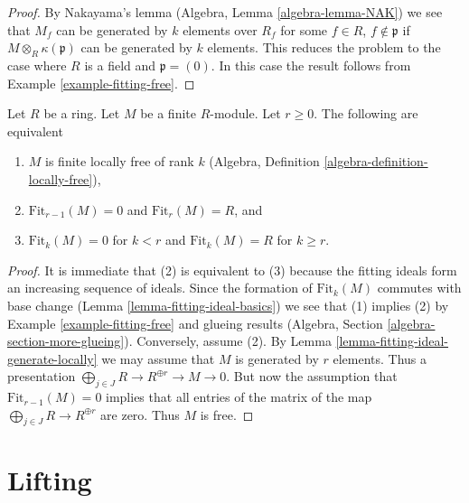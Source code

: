 \begin{proof}
By Nakayama's lemma (Algebra, Lemma \ref{algebra-lemma-NAK}) we see that
$M_f$ can be generated by $k$ elements over $R_f$ for some
$f \in R$, $f \not \in \mathfrak p$ if $M \otimes_R \kappa(\mathfrak p)$
can be generated by $k$ elements. This reduces the problem to the
case where $R$ is a field and $\mathfrak p = (0)$. In this case
the result follows from Example \ref{example-fitting-free}.
\end{proof}

\begin{lemma}
\label{lemma-fitting-ideal-finite-locally-free}
Let $R$ be a ring. Let $M$ be a finite $R$-module. Let $r \geq 0$.
The following are equivalent
\begin{enumerate}
\item $M$ is finite locally free of rank $k$
(Algebra, Definition \ref{algebra-definition-locally-free}),
\item $\text{Fit}_{r - 1}(M) = 0$ and $\text{Fit}_r(M) = R$, and
\item $\text{Fit}_k(M) = 0$ for $k < r$ and $\text{Fit}_k(M) = R$
for $k \geq r$.
\end{enumerate}
\end{lemma}

\begin{proof}
It is immediate that (2) is equivalent to (3) because the fitting ideals
form an increasing sequence of ideals.
Since the formation of $\text{Fit}_k(M)$ commutes with base change
(Lemma \ref{lemma-fitting-ideal-basics}) we see that (1) implies (2) by
Example \ref{example-fitting-free}
and glueing results (Algebra, Section \ref{algebra-section-more-glueing}).
Conversely, assume (2). By
Lemma \ref{lemma-fitting-ideal-generate-locally} we may assume that $M$
is generated by $r$ elements. Thus a presentation
$\bigoplus_{j \in J} R \to R^{\oplus r} \to M \to 0$.
But now the assumption that $\text{Fit}_{r - 1}(M) = 0$ implies
that all entries of the matrix of the map
$\bigoplus_{j \in J} R \to R^{\oplus r}$ are zero.
Thus $M$ is free.
\end{proof}










\section{Lifting}
\label{section-lifting}

